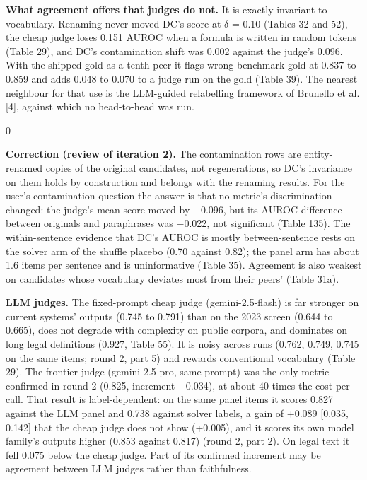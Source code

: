 \documentclass[11pt,letterpaper]{article}
\newenvironment{correction}{\par\medskip\noindent\begin{minipage}{\linewidth}\setlength{\fboxsep}{6pt}\begin{lrbox}{0}\begin{minipage}{0.96\linewidth}\small}{\end{minipage}\end{lrbox}\colorbox{black!6}{\usebox{0}}\end{minipage}\par\medskip}
\begin{document}
\textbf{What agreement offers that judges do not.} It is exactly invariant to vocabulary. Renaming never moved DC's score at $\delta$ = 0.10 (Tables 32 and 52), the cheap judge loses 0.151 AUROC when a formula is written in random tokens (Table 29), and DC's contamination shift was 0.002 against the judge's 0.096. With the shipped gold as a tenth peer it flags wrong benchmark gold at 0.837 to 0.859 and adds 0.048 to 0.070 to a judge run on the gold (Table 39). The nearest neighbour for that use is the LLM-guided relabelling framework of Brunello et al. [4], against which no head-to-head was run.

\begin{correction}\textbf{Correction (review of iteration 2).} The contamination rows are entity-renamed copies of the original candidates, not regenerations, so DC's invariance on them holds by construction and belongs with the renaming results. For the user's contamination question the answer is that no metric's discrimination changed: the judge's mean score moved by +0.096, but its AUROC difference between originals and paraphrases was $-$0.022, not significant (Table 135). The within-sentence evidence that DC's AUROC is mostly between-sentence rests on the solver arm of the shuffle placebo (0.70 against 0.82); the panel arm has about 1.6 items per sentence and is uninformative (Table 35). Agreement is also weakest on candidates whose vocabulary deviates most from their peers' (Table 31a).\end{correction}

\textbf{LLM judges.} The fixed-prompt cheap judge (gemini-2.5-flash) is far stronger on current systems' outputs (0.745 to 0.791) than on the 2023 screen (0.644 to 0.665), does not degrade with complexity on public corpora, and dominates on long legal definitions (0.927, Table 55). It is noisy across runs (0.762, 0.749, 0.745 on the same items; round 2, part 5) and rewards conventional vocabulary (Table 29). The frontier judge (gemini-2.5-pro, same prompt) was the only metric confirmed in round 2 (0.825, increment +0.034), at about 40 times the cost per call. That result is label-dependent: on the same panel items it scores 0.827 against the LLM panel and 0.738 against solver labels, a gain of +0.089 [0.035, 0.142] that the cheap judge does not show (+0.005), and it scores its own model family's outputs higher (0.853 against 0.817) (round 2, part 2). On legal text it fell 0.075 below the cheap judge. Part of its confirmed increment may be agreement between LLM judges rather than faithfulness.
\end{document}
